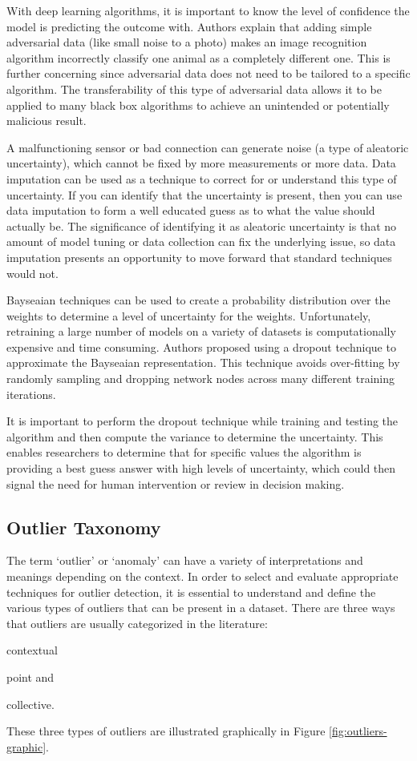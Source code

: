 With deep learning algorithms, it is important to know the level of confidence the model is predicting the outcome with. Authors \cite{explaining-adversarial-examples} explain that adding simple adversarial data (like small noise to a photo) makes an image recognition algorithm incorrectly classify one animal as a completely different one. This is further concerning since adversarial data does not need to be tailored to a specific algorithm. The transferability of this type of adversarial data allows it to be applied to many black box algorithms to achieve an unintended or potentially malicious result. 

A malfunctioning sensor or bad connection can generate noise (a type of aleatoric uncertainty), which cannot be fixed by more measurements or more data. Data imputation can be used as a technique to correct for or understand this type of uncertainty. If you can identify that the uncertainty is present, then you can use data imputation to form a well educated guess as to what the value should actually be. The significance of identifying it as aleatoric uncertainty is that no amount of model tuning or data collection can fix the underlying issue, so data imputation presents an opportunity to move forward that standard techniques would not.

Bayseaian techniques can be used to create a probability distribution over the weights to determine a level of uncertainty for the weights. Unfortunately, retraining a large number of models on a variety of datasets is computationally expensive and time consuming. Authors \cite{gal2016dropout} proposed using a dropout technique to approximate the Bayseaian representation. This technique avoids over-fitting by randomly sampling and dropping network nodes across many different training iterations.

It is important to perform the dropout technique while training and testing the algorithm and then compute the variance to determine the uncertainty. This enables researchers to determine that for specific values the algorithm is providing a best guess answer with high levels of uncertainty, which could then signal the need for human intervention or review in decision making.  

\subsection{Outlier Taxonomy}

The term `outlier' or `anomaly' can have a variety of interpretations and meanings depending on the context. In order to select and evaluate appropriate techniques for outlier detection, it is essential to understand and define the various types of outliers that can be present in a dataset. There are three ways that outliers are usually categorized in the literature:
\begin{inlinelist}
    \item contextual
    \item point and
    \item collective.
\end{inlinelist}
These three types of outliers are illustrated graphically in Figure \ref{fig:outliers-graphic}.

